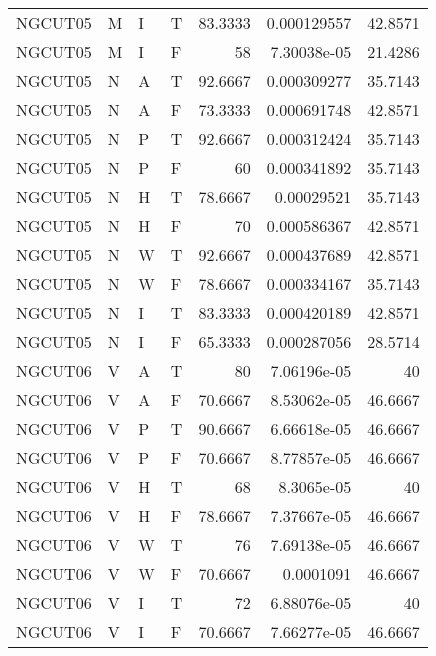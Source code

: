 \begin{longtable}{llllrrr}
    NGCUT05  & M     & I     & T          & 83.3333    & 0.000129557 & 42.8571  \\
    NGCUT05  & M     & I     & F          & 58         & 7.30038e-05 & 21.4286  \\
    NGCUT05  & N     & A     & T          & 92.6667    & 0.000309277 & 35.7143  \\
    NGCUT05  & N     & A     & F          & 73.3333    & 0.000691748 & 42.8571  \\
    NGCUT05  & N     & P     & T          & 92.6667    & 0.000312424 & 35.7143  \\
    NGCUT05  & N     & P     & F          & 60         & 0.000341892 & 35.7143  \\
    NGCUT05  & N     & H     & T          & 78.6667    & 0.00029521  & 35.7143  \\
    NGCUT05  & N     & H     & F          & 70         & 0.000586367 & 42.8571  \\
    NGCUT05  & N     & W     & T          & 92.6667    & 0.000437689 & 42.8571  \\
    NGCUT05  & N     & W     & F          & 78.6667    & 0.000334167 & 35.7143  \\
    NGCUT05  & N     & I     & T          & 83.3333    & 0.000420189 & 42.8571  \\
    NGCUT05  & N     & I     & F          & 65.3333    & 0.000287056 & 28.5714  \\
    NGCUT06  & V     & A     & T          & 80         & 7.06196e-05 & 40       \\
    NGCUT06  & V     & A     & F          & 70.6667    & 8.53062e-05 & 46.6667  \\
    NGCUT06  & V     & P     & T          & 90.6667    & 6.66618e-05 & 46.6667  \\
    NGCUT06  & V     & P     & F          & 70.6667    & 8.77857e-05 & 46.6667  \\
    NGCUT06  & V     & H     & T          & 68         & 8.3065e-05  & 40       \\
    NGCUT06  & V     & H     & F          & 78.6667    & 7.37667e-05 & 46.6667  \\
    NGCUT06  & V     & W     & T          & 76         & 7.69138e-05 & 46.6667  \\
    NGCUT06  & V     & W     & F          & 70.6667    & 0.0001091   & 46.6667  \\
    NGCUT06  & V     & I     & T          & 72         & 6.88076e-05 & 40       \\
    NGCUT06  & V     & I     & F          & 70.6667    & 7.66277e-05 & 46.6667  \\

\end{longtable}
